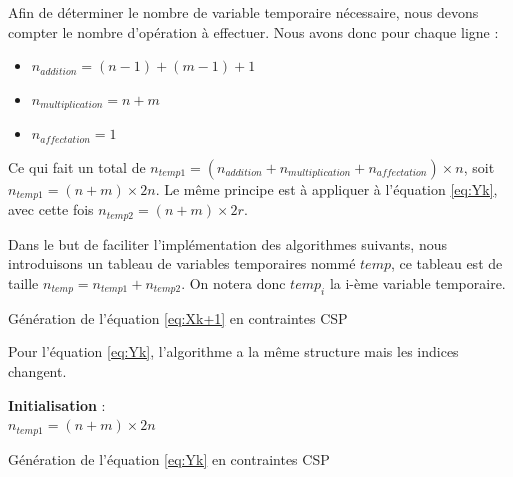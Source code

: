 Afin de déterminer le nombre de variable temporaire nécessaire, nous devons compter le nombre d'opération à effectuer. Nous avons donc pour chaque ligne : 
\begin{itemize}
	\item[] $n_{addition} = (n-1) + (m-1) + 1$
	\item[] $n_{multiplication} = n + m$
	\item[] $n_{affectation} = 1$
	\end{itemize}
	Ce qui fait un total de $n_{temp1} = (n_{addition} + n_{multiplication} + n_{affectation})\times n$, soit $n_{temp1} = (n + m)\times 2n$.
	Le même principe est à appliquer à l'équation \ref{eq:Yk}, avec cette fois $n_{temp2} = (n + m)\times 2r$.
	
	Dans le but de faciliter l'implémentation des algorithmes suivants, nous introduisons un tableau de variables temporaires nommé $temp$, ce tableau est de taille $n_{temp} = n_{temp1} + n_{temp2}$. On notera donc $temp_i$ la i-ème variable temporaire.
	\begin{algorithm}[H]
		\LinesNumbered
		
		\caption{Génération de l'équation \ref{eq:Xk+1} en contraintes CSP}
		\label{algo:XktoCSP}
	\end{algorithm}
	Pour l'équation \ref{eq:Yk}, l'algorithme a la même structure mais les indices changent.
	
	\begin{algorithm}[H]
		\LinesNumbered
		\textbf{Initialisation} :\\
		$n_{temp1} = (n + m)\times 2n$\;	
			
		\caption{Génération de l'équation \ref{eq:Yk} en contraintes CSP}
		\label{algo:YktoCSP}
	\end{algorithm}
	
